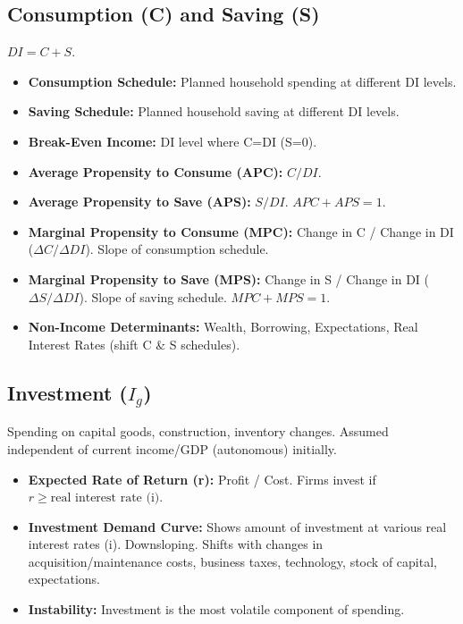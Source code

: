 \documentclass{article}
\begin{document}
\subsection*{Consumption (C) and Saving (S)}
$DI = C + S$.
\begin{itemize}
    \item \textbf{Consumption Schedule:} Planned household spending at different DI levels.
    \item \textbf{Saving Schedule:} Planned household saving at different DI levels.
    \item \textbf{Break-Even Income:} DI level where C=DI (S=0).
    \item \textbf{Average Propensity to Consume (APC):} $C / DI$.
    \item \textbf{Average Propensity to Save (APS):} $S / DI$. $APC + APS = 1$.
    \item \textbf{Marginal Propensity to Consume (MPC):} Change in C / Change in DI ($\Delta C / \Delta DI$). Slope of consumption schedule.
    \item \textbf{Marginal Propensity to Save (MPS):} Change in S / Change in DI ($\Delta S / \Delta DI$). Slope of saving schedule. $MPC + MPS = 1$.
    \item \textbf{Non-Income Determinants:} Wealth, Borrowing, Expectations, Real Interest Rates (shift C \& S schedules).
\end{itemize}

\subsection*{Investment ($I_g$)}
Spending on capital goods, construction, inventory changes. Assumed independent of current income/GDP (autonomous) initially.
\begin{itemize}
    \item \textbf{Expected Rate of Return (r):} Profit / Cost. Firms invest if $r \geq \text{real interest rate (i)}$.
    \item \textbf{Investment Demand Curve:} Shows amount of investment at various real interest rates (i). Downsloping. Shifts with changes in acquisition/maintenance costs, business taxes, technology, stock of capital, expectations.
    \item \textbf{Instability:} Investment is the most volatile component of spending.
\end{itemize}
\end{document}
